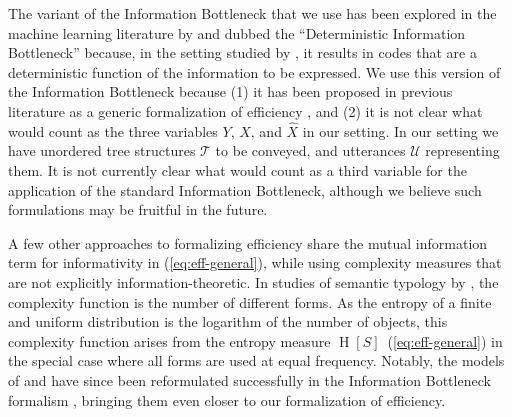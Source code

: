 \documentclass[10pt,twoside,lineno]{article}
\begin{document}
The variant of the Information Bottleneck that we use has been explored in the machine learning literature by \citet{strouse2017deterministic} and dubbed the ``Deterministic Information Bottleneck'' because, in the setting studied by \citet{strouse2017efficient}, it results in codes that are a deterministic function of the information to be expressed.
We use this version of the Information Bottleneck because (1) it has been proposed in previous literature as a generic formalization of efficiency \citep{ferreri2003least}, and (2) it is not clear what would count as the three variables $Y$, $X$, and $\hat{X}$ in our setting. In our setting we have unordered tree structures $\mathcal{T}$ to be conveyed, and utterances $\mathcal{U}$ representing them. It is not currently clear what would count as a third variable for the application of the standard Information Bottleneck, although we believe such formulations may be fruitful in the future.


A few other approaches to formalizing efficiency share the mutual information term for informativity in (\ref{eq:eff-general}), while using complexity measures that are not explicitly information-theoretic.
In studies of semantic typology by \citet{regier2007color, xu2014numeral, xu2016historical}, the complexity function is the number of different forms.
As the entropy of a finite and uniform distribution is the logarithm of the number of objects, this complexity function arises from the entropy measure $\operatorname{H}[S]$~(\ref{eq:eff-general}) in the special case where all forms are used at equal frequency.
Notably, the models of \citet{regier2007color} and \citet{xu2016historical} have since been reformulated successfully in the Information Bottleneck formalism \cite{zaslavsky2018efficient, zaslavsky2019semantic}, bringing them even closer to our formalization of efficiency.
\end{document}
